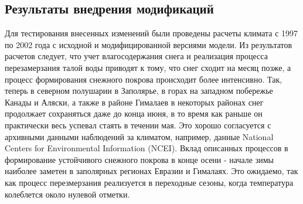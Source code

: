 \documentclass[a4paper, fontsize=14pt]{scrartcl}
\begin{document}
\subsection{Результаты внедрения модификаций}

Для тестирования внесенных изменений были проведены расчеты климата с 1997 по 2002 года с исходной и модифицированной версиями модели. Из результатов расчетов следует, что учет влагосодержания снега и реализация процесса перезамерзания талой воды приводят к тому, что снег сходит на месяц позже, а процесс формирования снежного покрова происходит более интенсивно. Так, теперь в северном полушарии в Заполярье, в горах на западном побережье Канады и Аляски, а также в районе Гималаев в некоторых районах снег продолжает сохраняться даже до конца июня, в то время как раньше он практически весь успевал стаять в течении мая. Это хорошо согласуется с архивными данными наблюдений за климатом, например, данные National Centers for Environmental Information (NCEI). Вклад описанных процессов в формирование устойчивого снежного покрова в конце осени - начале зимы наиболее заметен в заполярных регионах Евразии и Гималаях. Это ожидаемо, так как процесс перезмерзания реализуется в переходные сезоны, когда температура колеблется около нулевой отметки.
\end{document}
